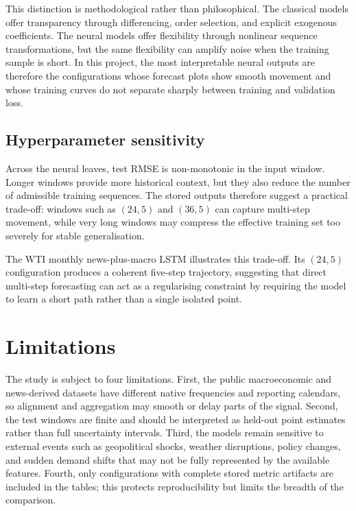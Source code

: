 \documentclass[11pt,a4paper]{article}
\begin{document}
This distinction is methodological rather than philosophical. The classical models offer transparency through differencing, order selection, and explicit exogenous coefficients. The neural models offer flexibility through nonlinear sequence transformations, but the same flexibility can amplify noise when the training sample is short. In this project, the most interpretable neural outputs are therefore the configurations whose forecast plots show smooth movement and whose training curves do not separate sharply between training and validation loss.

\subsection{Hyperparameter sensitivity}

Across the neural leaves, test RMSE is non-monotonic in the input window. Longer windows provide more historical context, but they also reduce the number of admissible training sequences. The stored outputs therefore suggest a practical trade-off: windows such as $(24,5)$ and $(36,5)$ can capture multi-step movement, while very long windows may compress the effective training set too severely for stable generalisation.

The WTI monthly news-plus-macro LSTM illustrates this trade-off. Its $(24,5)$ configuration produces a coherent five-step trajectory, suggesting that direct multi-step forecasting can act as a regularising constraint by requiring the model to learn a short path rather than a single isolated point.

\section{Limitations}\label{sec:limits}

The study is subject to four limitations. First, the public macroeconomic and news-derived datasets have different native frequencies and reporting calendars, so alignment and aggregation may smooth or delay parts of the signal. Second, the test windows are finite and should be interpreted as held-out point estimates rather than full uncertainty intervals. Third, the models remain sensitive to external events such as geopolitical shocks, weather disruptions, policy changes, and sudden demand shifts that may not be fully represented by the available features. Fourth, only configurations with complete stored metric artifacts are included in the tables; this protects reproducibility but limits the breadth of the comparison.
\end{document}
